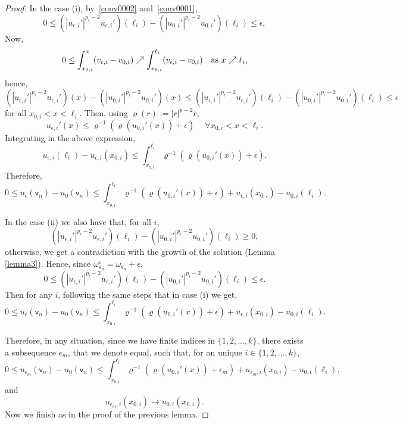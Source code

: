 \documentclass[reqno,12pt]{amsart}
\def\v{\mathsf{v}}	%
\numberwithin{equation}{section} %
\begin{document}
\begin{proof}
In the case   (i),  by~\eqref{conv0002} and~\eqref{conv0001},
\begin{equation}\label{satis2701002}0\le (|u_{\epsilon,i}'|^{p_i-2}u_{\epsilon,i}') (\ell_i) -  (|u_{0,i}'|^{p_i-2}u_{0,i}') (\ell_i)\le  \epsilon,
\end{equation}
Now,
$$
0\le \int_{x_{0,i}}^x(v_{\epsilon,i}-v_{0,i})\nearrow \int_{x_{0,i}}^{\ell_i}(v_{\epsilon,i}-v_{0,i}) \quad\hbox{as }x\nearrow \ell_i,
$$
hence,
$$
(|u_{\epsilon,i}'|^{p_i-2}u_{\epsilon,i}') (x) -  (|u_{0,i}'|^{p_i-2}u_{0,i}')(x) \le (|u_{\epsilon,i}'|^{p_i-2}u_{\epsilon,i}') (\ell_i) -  (|u_{0,i}'|^{p_i-2}u_{0,i}')(\ell_i)\le\epsilon 
$$
for  all $x_{0,i}<x<\ell_i.$
Then, using $\varrho(r):= \vert r \vert^{p-2}r$,
 $$u_{\epsilon,i}'(x)\le \varrho^{-1}\left(\varrho(u_{0,i}'(x))+\epsilon\right)\quad \ \forall x_{0,i}<x<\ell_i.$$
Integrating in the above expression,
 $$u_{\epsilon,i}(\ell_i)-u_{\epsilon,i}(x_{0,i})\le \int_{x_{0,i}}^{\ell_i}\varrho^{-1}\left(\varrho(u_{0,i}'(x))+\epsilon\right).$$
Therefore, 
\begin{equation}\label{27f22201}
0\le u_{\epsilon}(\v_n)-u_{0}(\v_n)\le \int_{x_{0,i}}^{\ell_i}\varrho^{-1}\left(\varrho(u_{0,i}'(x))+\epsilon\right)+u_{\epsilon,i}(x_{0,i})-u_{0,i}(\ell_i).
\end{equation}
  


In the case (ii)  we also have that, for all $i$,
$$ (|u_{\epsilon,i}'|^{p_i-2}u_{\epsilon,i}') (\ell_i) -  (|u_{0,i}'|^{p_i-2}u_{0,i}') (\ell_i)\ge  0,$$
otherwise, we get a contradiction with the growth of the solution (Lemma \ref{lemma3}).  Hence, since $\omega^\epsilon_{\v_n}=\omega_{\v_n}+\epsilon,$
\begin{equation}\label{satis2701001} 0\le (|u_{\epsilon,i}'|^{p_i-2}u_{\epsilon,i}') (\ell_i) -  (|u_{0,i}'|^{p_i-2}u_{0,i}') (\ell_i)\le  \epsilon.
\end{equation}
Then for any $i$,  following the same steps that in case (i) we get,  
$$0\le u_{\epsilon}(\v_n)-u_{0}(\v_n)\le \int_{x_{0,i}}^{\ell_i}\varrho^{-1}\left(\varrho(u_{0,i}'(x))+\epsilon\right)+u_{\epsilon,i}(x_{0,i})-u_{0,i}(\ell_i).$$

Therefore, in any situation, since we have finite indices in $\{1,2,...,k\}$, there exists a subsequence $\epsilon_{m}$, that we denote equal, such that, for an unique $i\in \{1,2,...,k\}$,
$$0\le u_{\epsilon_{m}}(\v_n)-u_{0}(\v_n)\le \int_{x_{0,i}}^{\ell_i}\varrho^{-1}\left(\varrho(u_{0,i}'(x))+\epsilon_{m}\right)+u_{\epsilon_{m},i}(x_{0,i})-u_{0,i}(\ell_i),$$
and $$u_{\epsilon_{m},i}(x_{0,i})\to u_{0,i}(x_{0,i}).$$
Now we finish as in the proof of the previous lemma.
\end{proof}
\end{document}
